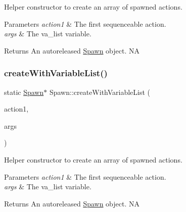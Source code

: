 Helper constructor to create an array of spawned actions.


\begin{DoxyParams}{Parameters}
{\em action1} & The first sequenceable action. \\
\hline
{\em args} & The va\+\_\+list variable. \\
\hline
\end{DoxyParams}
\begin{DoxyReturn}{Returns}
An autoreleased \hyperlink{classSpawn}{Spawn} object.  NA 
\end{DoxyReturn}
\mbox{\label{classSpawn_ae73792c91eb5b86d48338be1ce1a1ecb}} 
\subsubsection{\texorpdfstring{create\+With\+Variable\+List()}{createWithVariableList()}\hspace{0.1cm}{\footnotesize\ttfamily [2/2]}}
{\footnotesize\ttfamily static \hyperlink{classSpawn}{Spawn}$\ast$ Spawn\+::create\+With\+Variable\+List (\begin{DoxyParamCaption}\item[{\hyperlink{classFiniteTimeAction}{Finite\+Time\+Action} $\ast$}]{action1,  }\item[{va\+\_\+list}]{args }\end{DoxyParamCaption})\hspace{0.3cm}{\ttfamily [static]}}

Helper constructor to create an array of spawned actions.


\begin{DoxyParams}{Parameters}
{\em action1} & The first sequenceable action. \\
\hline
{\em args} & The va\+\_\+list variable. \\
\hline
\end{DoxyParams}
\begin{DoxyReturn}{Returns}
An autoreleased \hyperlink{classSpawn}{Spawn} object.  NA 
\end{DoxyReturn}
\mbox{\label{classSpawn_a7ca09352e8571699efd1582b0ad5ef45}} 
